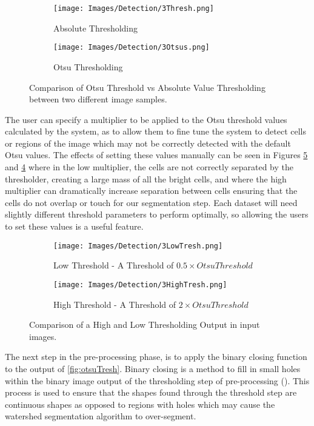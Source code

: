 \documentclass[12pt a4paper]{article}
\begin{document}
\begin{figure}
  \centering
  \begin{subfigure}{.5\textwidth}
  \centering
  \texttt{[image: Images/Detection/3Thresh.png]}
  \caption{Absolute Thresholding}
  \label{fig:sub-abs}
\end{subfigure}%
\begin{subfigure}{.5\textwidth}
  \centering
  \texttt{[image: Images/Detection/3Otsus.png]}
  \caption{Otsu Thresholding}
  \label{fig:sub-otsu}
\end{subfigure}
\label{fig:comp}
  \caption{Comparison of Otsu Threshold vs Absolute Value Thresholding between two different image samples.}
\end{figure}
The user can specify a multiplier to be applied to the Otsu threshold values calculated by the system, as to allow them to fine tune the system to detect cells or regions of the image which may not be correctly detected with the default Otsu values. The effects of setting these values manually can be seen in Figures \ref{fig:sub-high} and \ref{fig:sub-low} where in the low multiplier, the cells are not correctly separated by the thresholder, creating a large mass of all the bright cells, and where the high multiplier can dramatically increase separation between cells ensuring that the cells do not overlap or touch for our segmentation step. Each dataset will need slightly different threshold parameters to perform optimally, so allowing the users to set these values is a useful feature.
\begin{figure}
  \centering
  \begin{subfigure}{.5\textwidth}
  \centering
  \texttt{[image: Images/Detection/3LowTresh.png]}
  \caption{Low Threshold - A Threshold of $0.5 \times Otsu Threshold$}
  \label{fig:sub-low}
\end{subfigure}%
\begin{subfigure}{.5\textwidth}
  \centering
  \texttt{[image: Images/Detection/3HighTresh.png]}
  \caption{High Threshold - A Threshold of $2 \times Otsu Threshold$}
  \label{fig:sub-high}
\end{subfigure}
  \caption{Comparison of a High and Low Thresholding Output in input images.}
  \label{fig:lowvshigh}
\end{figure}
The next step in the pre-processing phase, is to apply the binary closing function to the output of \ref{fig:otsuTresh}. Binary closing is a method to fill in small holes within the binary image output of the thresholding step of pre-processing (\cite{chen1995recursive}). This process is used to ensure that the shapes found through the threshold step are continuous shapes as opposed to regions with holes which may cause the watershed segmentation algorithm to over-segment.
\end{document}
